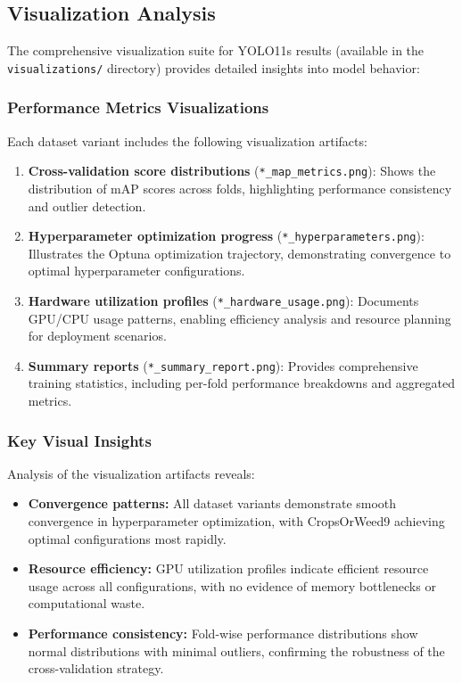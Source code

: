 \subsection{Visualization Analysis}

The comprehensive visualization suite for YOLO11s results (available in the \texttt{visualizations/} directory) provides detailed insights into model behavior:

\subsubsection{Performance Metrics Visualizations}

Each dataset variant includes the following visualization artifacts:

\begin{enumerate}
    \item \textbf{Cross-validation score distributions} (\texttt{*\_map\_metrics.png}): Shows the distribution of mAP scores across folds, highlighting performance consistency and outlier detection.
    
    \item \textbf{Hyperparameter optimization progress} (\texttt{*\_hyperparameters.png}): Illustrates the Optuna optimization trajectory, demonstrating convergence to optimal hyperparameter configurations.
    
    \item \textbf{Hardware utilization profiles} (\texttt{*\_hardware\_usage.png}): Documents GPU/CPU usage patterns, enabling efficiency analysis and resource planning for deployment scenarios.
    
    \item \textbf{Summary reports} (\texttt{*\_summary\_report.png}): Provides comprehensive training statistics, including per-fold performance breakdowns and aggregated metrics.
\end{enumerate}

\subsubsection{Key Visual Insights}

Analysis of the visualization artifacts reveals:

\begin{itemize}
    \item \textbf{Convergence patterns:} All dataset variants demonstrate smooth convergence in hyperparameter optimization, with CropsOrWeed9 achieving optimal configurations most rapidly.
    
    \item \textbf{Resource efficiency:} GPU utilization profiles indicate efficient resource usage across all configurations, with no evidence of memory bottlenecks or computational waste.
    
    \item \textbf{Performance consistency:} Fold-wise performance distributions show normal distributions with minimal outliers, confirming the robustness of the cross-validation strategy.
\end{itemize}


